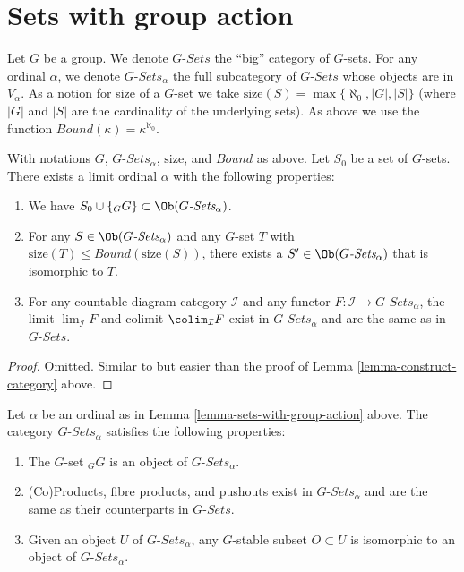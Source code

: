 \section{Sets with group action}
\label{section-sets-with-group-action}

\noindent
Let $G$ be a group. We denote $G\textit{-Sets}$ the ``big'' category
of $G$-sets. For any ordinal $\alpha$, we denote
$G\textit{-Sets}_\alpha$ the full subcategory of $G\textit{-Sets}$
whose objects are in $V_\alpha$. As a notion for size of a $G$-set
we take $\text{size}(S) = \max\{\aleph_0, |G|, |S|\}$ (where $|G|$ and
$|S|$ are the cardinality of the underlying sets). As above we use the function
$Bound(\kappa) = \kappa^{\aleph_0}$.

\begin{lemma}
\label{lemma-sets-with-group-action}
With notations $G$, $G\textit{-Sets}_\alpha$, $\text{size}$,
and $Bound$ as above. Let $S_0$ be a set of $G$-sets.
There exists a limit ordinal $\alpha$ with the following properties:
\begin{enumerate}
\item We have $S_0 \cup \{{}_GG\} \subset \Ob(G\textit{-Sets}_\alpha)$.
\item For any $S \in \Ob(G\textit{-Sets}_\alpha)$ and any
$G$-set $T$ with $\text{size}(T) \leq Bound(\text{size}(S))$,
there exists a $S' \in \Ob(G\textit{-Sets}_\alpha)$
that is isomorphic to $T$.
\item For any countable diagram category $\mathcal{I}$ and
any functor $F : \mathcal{I} \to G\textit{-Sets}_\alpha$, the
limit $\lim_\mathcal{I} F$ and colimit
$\colim_\mathcal{I} F$ exist in $G\textit{-Sets}_\alpha$
and are the same as in $G\textit{-Sets}$.
\end{enumerate}
\end{lemma}

\begin{proof}
Omitted. Similar to but easier than the proof of
Lemma \ref{lemma-construct-category} above.
\end{proof}

\begin{lemma}
\label{lemma-what-is-in-it-G-sets}
Let $\alpha$ be an ordinal as in Lemma \ref{lemma-sets-with-group-action}
above. The category $G\textit{-Sets}_\alpha$ satisfies the following
properties:
\begin{enumerate}
\item The $G$-set ${}_GG$ is an object of $G\textit{-Sets}_\alpha$.
\item (Co)Products, fibre products, and pushouts
exist in $G\textit{-Sets}_\alpha$
and are the same as their counterparts in $G\textit{-Sets}$.
\item Given an object $U$ of $G\textit{-Sets}_\alpha$,
any $G$-stable subset $O \subset U$  is isomorphic to an object
of $G\textit{-Sets}_\alpha$.
\end{enumerate}
\end{lemma}

